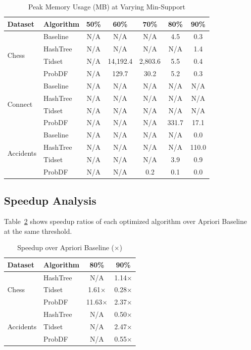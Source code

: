 \documentclass[conference]{IEEEtran}
\begin{document}
\begin{table}[H]
\centering
\caption{Peak Memory Usage (MB) at Varying Min-Support}
\label{tab:memory}
\setlength{\tabcolsep}{3pt}
\begin{tabular}{llccccc}
\toprule
\textbf{Dataset} & \textbf{Algorithm} & \textbf{50\%} & \textbf{60\%} & \textbf{70\%} & \textbf{80\%} & \textbf{90\%} \\
\midrule
\multirow{4}{*}{Chess}
  & Baseline & N/A & N/A      & N/A      & 4.5      & 0.3  \\
  & HashTree & N/A & N/A      & N/A      & N/A      & 1.4  \\
  & Tidset   & N/A & 14,192.4 & 2,803.6  & 5.5      & 0.4  \\
  & ProbDF   & N/A & 129.7    & 30.2     & 5.2      & 0.3  \\
\midrule
\multirow{4}{*}{Connect}
  & Baseline & N/A & N/A & N/A & N/A   & N/A  \\
  & HashTree & N/A & N/A & N/A & N/A   & N/A  \\
  & Tidset   & N/A & N/A & N/A & N/A   & N/A  \\
  & ProbDF   & N/A & N/A & N/A & 331.7 & 17.1 \\
\midrule
\multirow{4}{*}{Accidents}
  & Baseline & N/A & N/A & N/A & N/A & 0.0   \\
  & HashTree & N/A & N/A & N/A & N/A & 110.0 \\
  & Tidset   & N/A & N/A & N/A & 3.9 & 0.9   \\
  & ProbDF   & N/A & N/A & 0.2 & 0.1 & 0.0   \\
\bottomrule
\end{tabular}
\end{table}

\subsection{Speedup Analysis}

Table~\ref{tab:speedup} shows speedup ratios of each optimized algorithm
over Apriori Baseline at the same threshold.

\begin{table}[H]
\centering
\caption{Speedup over Apriori Baseline ($\times$)}
\label{tab:speedup}
\begin{tabular}{llcc}
\toprule
\textbf{Dataset} & \textbf{Algorithm} & \textbf{80\%} & \textbf{90\%} \\
\midrule
\multirow{3}{*}{Chess}
  & HashTree & N/A          & 1.14$\times$ \\
  & Tidset   & 1.61$\times$ & 0.28$\times$ \\
  & ProbDF   & 11.63$\times$ & 2.37$\times$ \\
\midrule
\multirow{3}{*}{Accidents}
  & HashTree & N/A          & 0.50$\times$ \\
  & Tidset   & N/A          & 2.47$\times$ \\
  & ProbDF   & N/A          & 0.55$\times$ \\
\bottomrule
\end{tabular}
\end{table}
\end{document}
